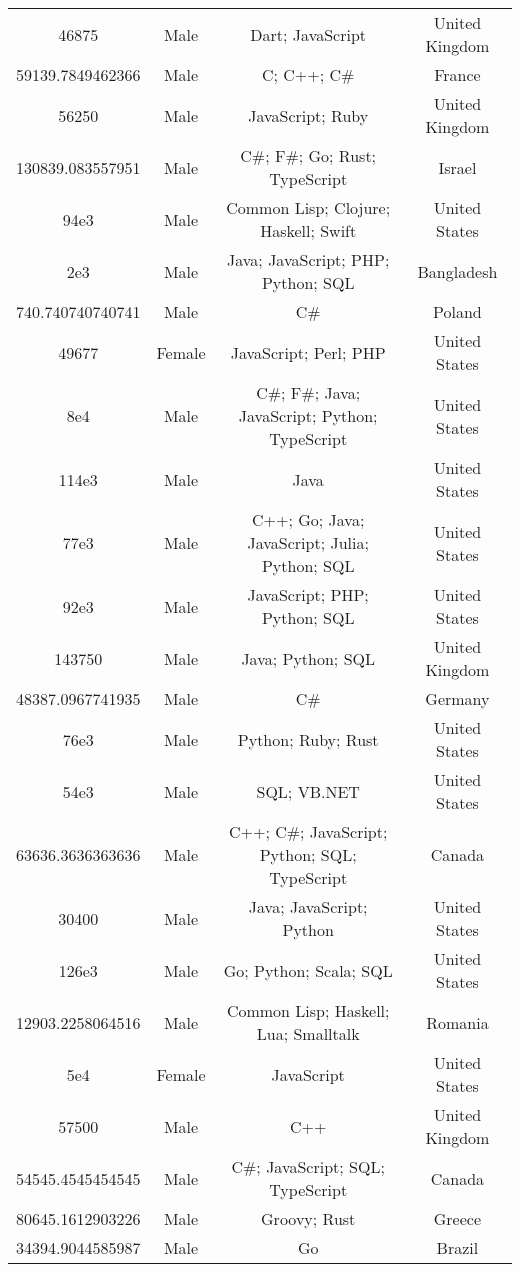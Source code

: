 \begin{center}
\begin{tabular}{ |c|c|c|c| }
46875  &  Male  &  Dart; JavaScript  &  United Kingdom  \\ 
59139.7849462366  &  Male  &  C; C++; C\#  &  France  \\ 
56250  &  Male  &  JavaScript; Ruby  &  United Kingdom  \\ 
130839.083557951  &  Male  &  C\#; F\#; Go; Rust; TypeScript  &  Israel  \\ 
94e3  &  Male  &  Common Lisp; Clojure; Haskell; Swift  &  United States  \\ 
2e3  &  Male  &  Java; JavaScript; PHP; Python; SQL  &  Bangladesh  \\ 
740.740740740741  &  Male  &  C\#  &  Poland  \\ 
49677  &  Female  &  JavaScript; Perl; PHP  &  United States  \\ 
8e4  &  Male  &  C\#; F\#; Java; JavaScript; Python; TypeScript  &  United States  \\ 
114e3  &  Male  &  Java  &  United States  \\ 
77e3  &  Male  &  C++; Go; Java; JavaScript; Julia; Python; SQL  &  United States  \\ 
92e3  &  Male  &  JavaScript; PHP; Python; SQL  &  United States  \\ 
143750  &  Male  &  Java; Python; SQL  &  United Kingdom  \\ 
48387.0967741935  &  Male  &  C\#  &  Germany  \\ 
76e3  &  Male  &  Python; Ruby; Rust  &  United States  \\ 
54e3  &  Male  &  SQL; VB.NET  &  United States  \\ 
63636.3636363636  &  Male  &  C++; C\#; JavaScript; Python; SQL; TypeScript  &  Canada  \\ 
30400  &  Male  &  Java; JavaScript; Python  &  United States  \\ 
126e3  &  Male  &  Go; Python; Scala; SQL  &  United States  \\ 
12903.2258064516  &  Male  &  Common Lisp; Haskell; Lua; Smalltalk  &  Romania  \\ 
5e4  &  Female  &  JavaScript  &  United States  \\ 
57500  &  Male  &  C++  &  United Kingdom  \\ 
54545.4545454545  &  Male  &  C\#; JavaScript; SQL; TypeScript  &  Canada  \\ 
80645.1612903226  &  Male  &  Groovy; Rust  &  Greece  \\ 
34394.9044585987  &  Male  &  Go  &  Brazil  \\ 

\end{tabular}
\end{center}

